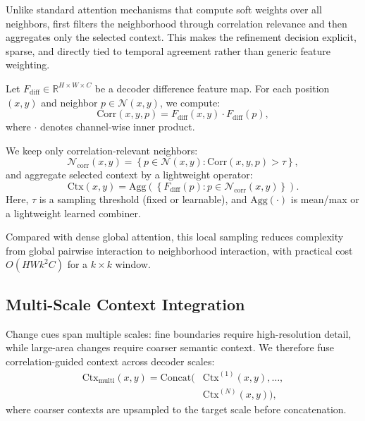 Unlike standard attention mechanisms that compute soft weights over all neighbors, \cosa{} first filters the neighborhood through correlation relevance and then aggregates only the selected context. This makes the refinement decision explicit, sparse, and directly tied to temporal agreement rather than generic feature weighting.

Let $F_{\text{diff}} \in \mathbb{R}^{H \times W \times C}$ be a decoder difference feature map. For each position $(x,y)$ and neighbor $p \in \mathcal{N}(x,y)$, we compute:
\begin{equation}
\mathrm{Corr}(x,y,p) = F_{\text{diff}}(x,y)\cdot F_{\text{diff}}(p),
\end{equation}
where $\cdot$ denotes channel-wise inner product.

We keep only correlation-relevant neighbors:
\begin{equation}
\mathcal{N}_{\text{corr}}(x,y)=\left\{p\in\mathcal{N}(x,y): \mathrm{Corr}(x,y,p)>\tau \right\},
\end{equation}
and aggregate selected context by a lightweight operator:
\begin{equation}
\mathrm{Ctx}(x,y)=\mathrm{Agg}\!\left(\left\{F_{\text{diff}}(p): p \in \mathcal{N}_{\text{corr}}(x,y)\right\}\right).
\end{equation}
Here, $\tau$ is a sampling threshold (fixed or learnable), and $\mathrm{Agg}(\cdot)$ is mean/max or a lightweight learned combiner.

Compared with dense global attention, this local sampling reduces complexity from global pairwise interaction to neighborhood interaction, with practical cost $O(HWk^2C)$ for a $k \times k$ window.

\subsection{Multi-Scale Context Integration}
Change cues span multiple scales: fine boundaries require high-resolution detail, while large-area changes require coarser semantic context. We therefore fuse correlation-guided context across decoder scales:
\begin{equation}
\begin{aligned}
\mathrm{Ctx}_{\text{multi}}(x,y)=\mathrm{Concat}\big(&\mathrm{Ctx}^{(1)}(x,y),\ldots,\\
&\mathrm{Ctx}^{(N)}(x,y)\big),
\end{aligned}
\end{equation}
where coarser contexts are upsampled to the target scale before concatenation.

